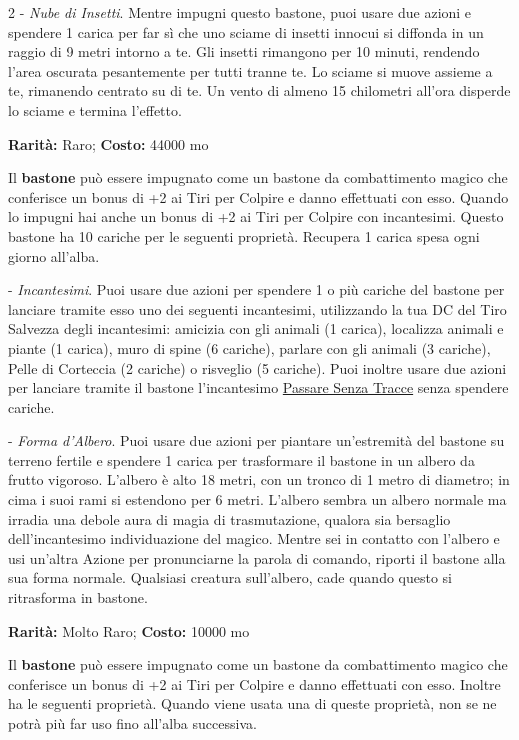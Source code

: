\begin{multicols}{2}
- \emph{Nube di Insetti}. Mentre impugni questo bastone, puoi usare due azioni e spendere 1 carica per far sì che uno sciame di insetti innocui si diffonda in un raggio di 9 metri intorno a te. Gli insetti rimangono per 10 minuti, rendendo l'area oscurata pesantemente per tutti tranne te. Lo sciame si muove assieme a te, rimanendo centrato su di te. Un vento di almeno 15 chilometri all'ora disperde lo sciame e termina l'effetto.


\textbf{Rarità:} Raro; \textbf{Costo:} 44000 mo

Il \textbf{bastone} può essere impugnato come un bastone da combattimento magico che conferisce un bonus di +2 ai Tiri per Colpire e danno effettuati con esso. Quando lo impugni hai anche un bonus di +2 ai Tiri per Colpire con incantesimi.
Questo bastone ha 10 cariche per le seguenti proprietà. Recupera 1 carica spesa ogni giorno all'alba.

- \emph{Incantesimi}. Puoi usare due azioni per spendere 1 o più cariche del bastone per lanciare tramite esso uno dei seguenti incantesimi, utilizzando la tua DC del Tiro Salvezza degli incantesimi: amicizia con gli animali (1 carica), localizza animali e piante (1 carica), muro di spine (6 cariche), parlare con gli animali (3 cariche), Pelle di Corteccia (2 cariche) o risveglio (5 cariche). Puoi inoltre usare due azioni per lanciare tramite il bastone l'incantesimo \hyperlink{Passare Senza Tracce}{Passare Senza Tracce} senza spendere cariche.

- \emph{Forma d'Albero}. Puoi usare due azioni per piantare un'estremità del bastone su terreno fertile e spendere 1 carica per trasformare il bastone in un albero da frutto vigoroso. L'albero è alto 18 metri, con un tronco di 1 metro di diametro; in cima i suoi rami si estendono per 6 metri. L'albero sembra un albero normale ma irradia una debole aura di magia di trasmutazione, qualora sia bersaglio dell'incantesimo individuazione del magico. Mentre sei in contatto con l'albero e usi un'altra Azione per pronunciarne la parola di comando, riporti il bastone alla sua forma normale. Qualsiasi creatura sull'albero, cade quando questo si ritrasforma in bastone.


\textbf{Rarità:} Molto Raro; \textbf{Costo:} 10000 mo

Il \textbf{bastone} può essere impugnato come un bastone da combattimento magico che conferisce un bonus di +2 ai Tiri per Colpire e danno effettuati con esso. Inoltre ha le seguenti proprietà. Quando viene usata una di queste proprietà, non se ne potrà più far uso fino all'alba successiva.


\end{multicols}
